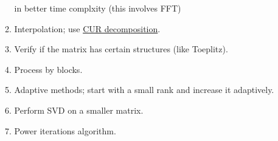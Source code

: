 \documentclass[11pt,reqno]{amsart}
\theoremstyle{remark}
\begin{document}
\begin{itemize}
\begin{enumerate}
 in better time complxity (this involves FFT)
\item Interpolation; use \href{https://docs.oracle.com/en/database/oracle/machine-learning/oml4sql/21/dmcon/cur-matrix-decomposition.html#GUID-9C3BF153-3A2B-4B4B-B711-D48976806799}
{CUR decomposition}.
\item Verify if the matrix has certain structures (like Toeplitz).
\item Process by blocks.
\item Adaptive methods; start with a small rank and increase it adaptively.
\item Perform SVD on a smaller matrix.
\item Power iterations algorithm.
\end{enumerate}
\end{itemize}
\end{document}
